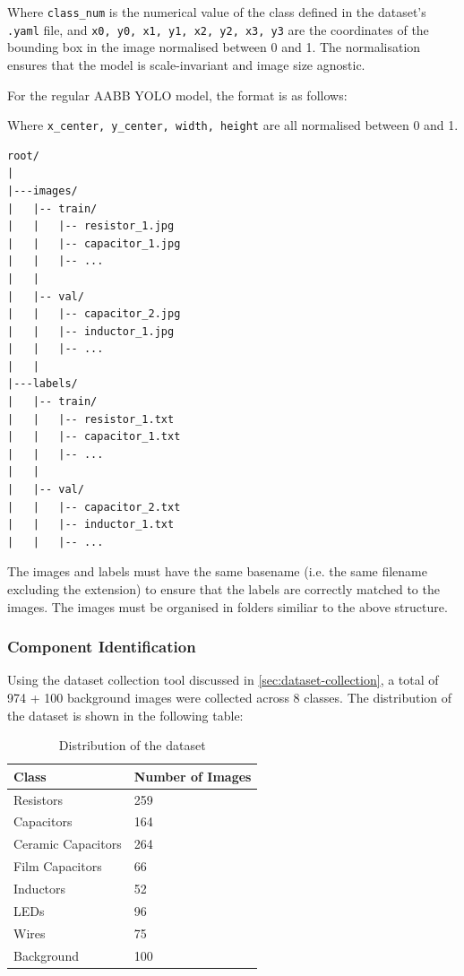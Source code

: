 Where \texttt{class\_num} is the numerical value of the class defined in the dataset's \texttt{.yaml} file, and \texttt{x0, y0, x1, y1, x2, y2, x3, y3} are the coordinates of the bounding box in the image normalised between 0 and 1. The normalisation ensures that the model is scale-invariant and image size agnostic.

For the regular AABB YOLO model, the format is as follows:
\begin{center}
\end{center}

Where \texttt{x\_center, y\_center, width, height} are all normalised between 0 and 1.

\begin{minipage}[H]{\textwidth}
\begin{verbatim}
root/
|
|---images/
|   |-- train/
|   |   |-- resistor_1.jpg
|   |   |-- capacitor_1.jpg
|   |   |-- ...
|   |
|   |-- val/
|   |   |-- capacitor_2.jpg
|   |   |-- inductor_1.jpg
|   |   |-- ...
|   |
|---labels/
|   |-- train/
|   |   |-- resistor_1.txt
|   |   |-- capacitor_1.txt
|   |   |-- ...
|   |
|   |-- val/
|   |   |-- capacitor_2.txt
|   |   |-- inductor_1.txt
|   |   |-- ...
\end{verbatim}
\label{code:dataset-structure}
\end{minipage}

The images and labels must have the same basename (i.e. the same filename excluding the extension) to ensure that the labels are correctly matched to the images. The images must be organised in folders similiar to the above structure.

\subsubsection{Component Identification}
Using the dataset collection tool discussed in \autoref{sec:dataset-collection}, a total of 974 + 100 background images were collected across 8 classes. The distribution of the dataset is shown in the following table:
\begin{table}[H]
  \centering
  \begin{tabularx}{0.5\textwidth}{|X|X|}
    \hline
    \textbf{Class} & \textbf{Number of Images} \\
    \hline
    Resistors & 259 \\
    \hline
    Capacitors & 164 \\
    \hline
    Ceramic Capacitors & 264 \\
    \hline
    Film Capacitors & 66 \\
    \hline
    Inductors & 52 \\
    \hline
    LEDs & 96 \\
    \hline
    Wires & 75 \\
    \hline
    Background & 100 \\
    \hline
  \end{tabularx}
  \caption{Distribution of the dataset}
  \label{tab:dataset-distribution}
\end{table}

